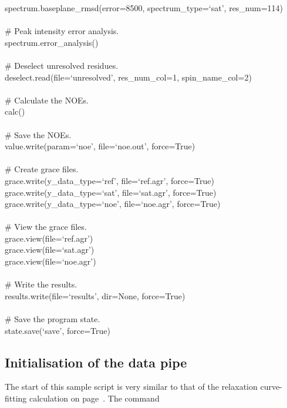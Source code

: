 \begin{exampleenv}
spectrum.baseplane\_rmsd(error=8500, spectrum\_type=`sat', res\_num=114) \\
 \\
\# Peak intensity error analysis. \\
spectrum.error\_analysis() \\
 \\
\# Deselect unresolved residues. \\
deselect.read(file=`unresolved', res\_num\_col=1, spin\_name\_col=2) \\
 \\
\# Calculate the NOEs. \\
calc() \\
 \\
\# Save the NOEs. \\
value.write(param=`noe', file=`noe.out', force=True) \\
 \\
\# Create grace files. \\
grace.write(y\_data\_type=`ref', file=`ref.agr', force=True) \\
grace.write(y\_data\_type=`sat', file=`sat.agr', force=True) \\
grace.write(y\_data\_type=`noe', file=`noe.agr', force=True) \\
 \\
\# View the grace files. \\
grace.view(file=`ref.agr') \\
grace.view(file=`sat.agr') \\
grace.view(file=`noe.agr') \\
 \\
\# Write the results. \\
results.write(file=`results', dir=None, force=True) \\
 \\
\# Save the program state. \\
state.save(`save', force=True)
\end{exampleenv}




\subsection{Initialisation of the data pipe} \label{NOE initialisation}

The start of this sample script is very similar to that of the relaxation curve-fitting calculation on page~\pageref{Rx initialisation}.  The command

